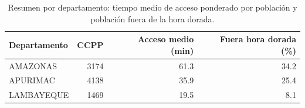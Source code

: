 \begin{table}[htbp]\centering
\caption{Resumen por departamento: tiempo medio de acceso ponderado por poblaci\'on y poblaci\'on fuera de la hora dorada.}\label{tab:departamento}
\begin{tabular}{lrrr}
\toprule
Departamento & CCPP & Acceso medio (min) & Fuera hora dorada (\%) \\
\midrule
AMAZONAS & 3174 & 61.3 & 34.2 \\
APURIMAC & 4138 & 35.9 & 25.4 \\
LAMBAYEQUE & 1469 & 19.5 & 8.1 \\
\bottomrule
\end{tabular}
\end{table}
